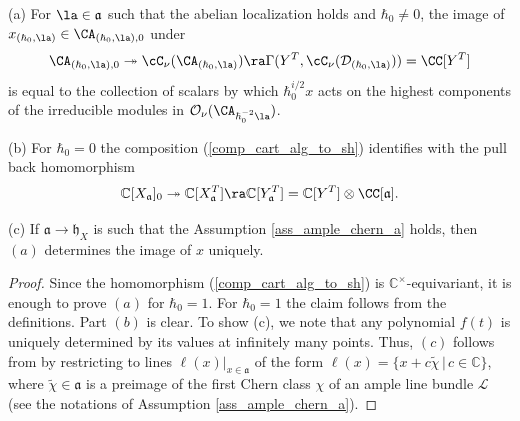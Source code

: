 \documentclass[12pt]{amsart}
\newcommand{\CO}{\mathcal{O}}
\begin{document}
\begin{prop}\label{hw_geom_vs_hw_alg} 
(a) For $\la \in \mathfrak{a}$ such that the abelian localization holds and $\hbar_0 \neq 0$, the image of $x_{(\hbar_0, \la)} \in \CA_{(\hbar_0, \la),0}$ under 
\begin{equation*}
\CA_{(\hbar_0, \la),0} \twoheadrightarrow \cC_\nu(\CA_{(\hbar_0, \la)}) \ra \Gamma(Y^T,\cC_\nu(\mathcal{D}_{(\hbar_0, \la)}))=\CC[Y^T]
\end{equation*}
is equal to the collection of scalars by which $\hbar_0^{{{i/2}}}x$ acts on the highest components of the irreducible modules in $\CO_\nu(\CA_{\hbar_0^{-2}\la})$.

(b) For $\hbar_0=0$ the composition (\ref{comp_cart_alg_to_sh}) identifies with the pull back homomorphism 
\begin{equation*}
\mathbb{C}[X_{\mathfrak{a}}]_0 \twoheadrightarrow \mathbb{C}[X_{\mathfrak{a}}^{T}] \ra \mathbb{C}[Y_{\mathfrak{a}}^T]=\mathbb{C}[Y^T] \otimes \CC[\mathfrak{a}].
\end{equation*}

(c) If $\mathfrak{a} \rightarrow \mathfrak{h}_X$ is such that the Assumption \ref{ass_ample_chern_a} 
holds, then  $(a)$ determines the image of $x$ uniquely. 
\end{prop}
\begin{proof}
Since the homomorphism (\ref{comp_cart_alg_to_sh}) is $\mathbb{C}^\times$-equivariant, it is enough to prove $(a)$ for $\hbar_0=1$. For $\hbar_0=1$ the claim follows from the definitions. Part $(b)$ is clear. To show (c), we note that any polynomial $f(t)$ is uniquely determined by its values at infinitely many points. Thus, $(c)$ follows from \cite[Corollary B.1]{BPW} by restricting to lines $\ell(x)|_{x \in \mathfrak{a}}$ of the form $\ell(x)=\{x+c\tilde{\chi}\,|\, c \in \mathbb{C}\}$, where $\tilde{\chi} \in \mathfrak{a}$ is a preimage of the first Chern class $\chi$ of an ample line bundle $\mathcal{L}$ (see the notations of Assumption \ref{ass_ample_chern_a}).
\end{proof}
\end{document}
